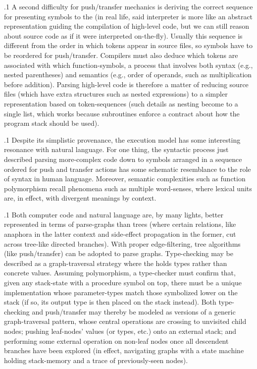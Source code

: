 \documentclass[11pt, twocolumn]{article}
\begin{document}
\p.1{%
A second difficulty for push/transfer mechanics is deriving the correct
sequence for presenting symbols to the  (in real life, said
interpreter is more like an abstract representation guiding the compilation
of high-level code, but we can still reason about source
code as if it were interpreted on-the-fly).  Usually this sequence is
different from the order in which tokens appear in source files, so symbols
have to be reordered for push/transfer.  Compilers must also deduce which tokens
are associated with which function-symbols, a process that involves
both syntax (e.g., nested parentheses) and semantics (e.g., order of operands,
such as multiplication before addition).  Parsing high-level code is therefore a
matter of reducing source files (which have extra structures such as nested
expressions) to a simpler representation based on token-sequences
(such details as nesting become  to a single list, which works
because subroutines enforce a contract about how the program stack should be used).
} %

\p.1{%
Despite its simplistic provenance, the  execution model
has some interesting resonance with natural language.  For one
thing, the syntactic process just described \mdash{} parsing more-complex
code down to symbols arranged in a sequence ordered for push and transfer
actions \mdash{} has some schematic resemblance to the role of syntax
in human language.  Moreover, semantic complexities such as
function polymorphism recall phenomena such as multiple word-senses,
where lexical units are, in effect,  with divergent
meanings by context.
} %

\p.1{%
Both computer code and natural language are, by many lights,
better represented in terms of parse-graphs than trees
(where certain relations, like anaphora in the latter context
and side-effect propagation in the former, cut across tree-like
directed branches).  With proper edge-filtering, tree 
algorithms (like push/transfer) can be adopted to parse graphs.
Type-checking may be described as a graph-traversal
strategy where the  holds types rather
than concrete values.  Assuming polymorphism,
a type-checker must confirm that, given any stack-state with a
procedure symbol on top, there must be a unique implementation
whose parameter-types match those symbolized lower on the stack
(if so, its output type is then placed on the stack instead).
Both type-checking and push/transfer may thereby be modeled
as versions of a generic graph-traversal pattern, whose
central operations are crossing to unvisited child nodes;
pushing leaf-nodes' values (or types, etc.) onto an
external stack; and performing some external operation
on non-leaf nodes once all descendent branches have been explored
(in effect, navigating graphs with a state
machine holding stack-memory and a trace of previously-seen nodes).
} %
\end{document}
